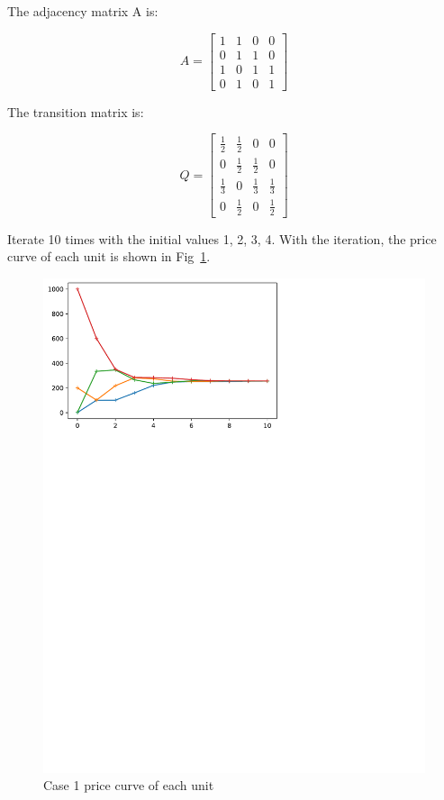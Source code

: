 \documentclass[conference]{IEEEtran}
\begin{document}
The adjacency matrix A is:

\begin{equation}
    A=\left[\begin{array}{cccc}
    {1} & {1} & {0} & {0} \\
    {0} & {1} & {1} & {0} \\
    {1} & {0} & {1} & {1} \\
    {0} & {1} & {0} & {1}
    \end{array}\right]
\end{equation}

The transition matrix is:

\begin{equation}
    Q=\left[\begin{array}{cccc}
    {\frac{1}{2}} & {\frac{1}{2}} & {0} & {0} \\
    {0} & {\frac{1}{2}} & {\frac{1}{2}} & {0} \\
    {\frac{1}{3}} & {0} & {\frac{1}{3}} & {\frac{1}{3}} \\
    {0} & {\frac{1}{2}} & {0} & {\frac{1}{2}}
    \end{array}\right]
\end{equation}

Iterate 10 times with the initial values 1, 2, 3, 4. With the iteration, the price curve of each unit is shown in Fig~\ref{fig:Result-1234}.

\begin{figure}[htbp]
    \centering
    \includegraphics[width=\columnwidth]{1234.pdf}
    \caption{Case 1 price curve of each unit}
    \label{fig:Result-1234}
\end{figure}
\end{document}
